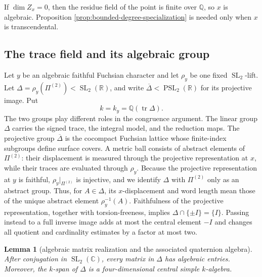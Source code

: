 \documentclass[11pt,reqno]{amsart}
\newtheorem{lemma}[theorem]{Lemma}
\theoremstyle{definition}
\theoremstyle{remark}
\newcommand{\R}{\mathbb R}
\newcommand{\C}{\mathbb C}
\newcommand{\Q}{\mathbb Q}
\newcommand{\Tr}{\operatorname{tr}}
\newcommand{\SL}{\operatorname{SL}}
\newcommand{\PSL}{\operatorname{PSL}}
\begin{document}
If \(\dim Z_x=0\), then the residue field of the point is finite over
\(\Q\), so \(x\) is algebraic.  Proposition
\ref{prop:bounded-degree-specialization} is needed only when \(x\) is
transcendental.

\subsection{The trace field and its algebraic group}

Let \(y\) be an algebraic faithful Fuchsian character and let
\(\rho_y\) be one fixed \(\SL_2\)-lift.  Let
\(\Delta=\rho_y(\Pi^{(2)})<\SL_2(\R)\), and write
\(\overline\Delta<\PSL_2(\R)\) for its projective image.  Put
\[
 k=k_y=\Q(\Tr\Delta).
\]
The two groups play different roles in the congruence argument.  The linear
group \(\Delta\) carries the signed trace, the integral model, and the
reduction maps.  The projective group \(\overline\Delta\) is the
cocompact Fuchsian lattice whose finite-index subgroups define surface
covers.  A metric ball consists of abstract elements of \(\Pi^{(2)}\):
their displacement is measured through the projective representation at
\(x\), while their traces are evaluated through \(\rho_y\).
Because the projective representation at \(y\) is faithful,
\(\rho_y|_{\Pi^{(2)}}\) is injective, and we identify \(\Delta\) with
\(\Pi^{(2)}\) only as an abstract group.  Thus, for \(A\in\Delta\), its
\(x\)-displacement and word length mean those of the unique abstract element
\(\rho_y^{-1}(A)\).
Faithfulness of the projective representation, together with
torsion-freeness, implies
\(\Delta\cap\{\pm I\}=\{I\}\).  Passing instead to a full inverse image
adds at most the central element \(-I\) and changes all quotient and
cardinality estimates by a factor at most two.

\begin{lemma}[algebraic matrix realization and the associated quaternion algebra]
\label{lem:algebraic-realization}
After conjugation in \(\SL_2(\C)\), every matrix in \(\Delta\) has
algebraic entries.  Moreover, the \(k\)-span of \(\Delta\) is a
four-dimensional central simple \(k\)-algebra.
\end{lemma}
\end{document}

